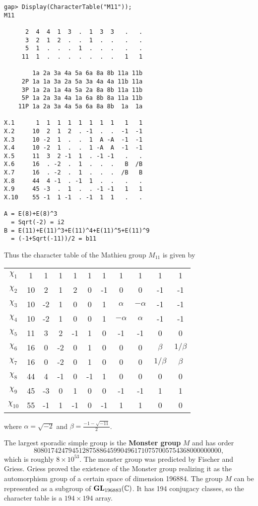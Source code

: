 \begin{lstlisting}
gap> Display(CharacterTable("M11"));
M11

      2  4  4  1  3  .  1  3  3   .   .
      3  2  1  2  .  .  1  .  .   .   .
      5  1  .  .  .  1  .  .  .   .   .
     11  1  .  .  .  .  .  .  .   1   1

        1a 2a 3a 4a 5a 6a 8a 8b 11a 11b
     2P 1a 1a 3a 2a 5a 3a 4a 4a 11b 11a
     3P 1a 2a 1a 4a 5a 2a 8a 8b 11a 11b
     5P 1a 2a 3a 4a 1a 6a 8b 8a 11a 11b
    11P 1a 2a 3a 4a 5a 6a 8a 8b  1a  1a

X.1      1  1  1  1  1  1  1  1   1   1
X.2     10  2  1  2  . -1  .  .  -1  -1
X.3     10 -2  1  .  .  1  A -A  -1  -1
X.4     10 -2  1  .  .  1 -A  A  -1  -1
X.5     11  3  2 -1  1  . -1 -1   .   .
X.6     16  . -2  .  1  .  .  .   B  /B
X.7     16  . -2  .  1  .  .  .  /B   B
X.8     44  4 -1  . -1  1  .  .   .   .
X.9     45 -3  .  1  .  . -1 -1   1   1
X.10    55 -1  1 -1  . -1  1  1   .   .

A = E(8)+E(8)^3
  = Sqrt(-2) = i2
B = E(11)+E(11)^3+E(11)^4+E(11)^5+E(11)^9
  = (-1+Sqrt(-11))/2 = b11
\end{lstlisting}

Thus the character table of the Mathieu group $M_{11}$ is
given by
\begin{center}
		\begin{tabular}{|c|cccccccccc|}
			\hline
			$\chi_{1}$ & 1 & 1 & 1 & 1 & 1 & 1 & 1 & 1 & 1 & 1\tabularnewline
			$\chi_{2}$ & 10 & 2 & 1 & 2 & 0 & -1 & 0 & 0 & -1 & -1 \tabularnewline
			$\chi_{3}$ & 10 & -2 & 1 & 0 & 0 & 1 & $\alpha$ & $-\alpha$ & -1 & -1\tabularnewline
		    $\chi_{4}$ & 10 & -2 & 1 & 0 & 0 & 1 & $-\alpha$ & $\alpha$ & -1 & -1\tabularnewline
		    $\chi_{5}$ & 11 & 3 & 2 &-1 & 1 & 0 & -1 & -1 & 0 & 0\tabularnewline
			$\chi_{6}$ & 16 & 0 & -2 & 0 & 1 & 0 & 0 & 0 & $\beta$ & $1/\beta$\tabularnewline
			$\chi_{7}$ & 16 & 0 & -2 & 0 & 1 & 0 & 0 & 0 & $1/\beta$ & $\beta$\tabularnewline
			$\chi_{8}$ & 44 & 4 &-1 & 0 &-1 & 1 & 0 & 0 & 0 & 0\tabularnewline
			$\chi_{9}$ & 45 & -3 & 0 & 1 & 0 & 0 &-1 &-1 &  1 & 1\tabularnewline
			$\chi_{10}$ & 55 & -1 & 1 & -1 & 0 & -1 & 1 & 1 & 0 & 0\tabularnewline
			\hline
		\end{tabular}    
\end{center}
where $\alpha=\sqrt{-2}$ and $\beta=\frac{-1-\sqrt{-11}}{2}$. 

The largest sporadic simple group is the \textbf{Monster group} $M$ and has order
\[
808017424794512875886459904961710757005754368000000000, 
\]
which is roughly $8\times 10^{53}$. 
The monster group was predicted by Fischer and Griess. 
Griess proved the existence of the Monster group realizing it as
the automorphism group of a certain space of dimension 196884. 
The group $M$ can be represented as
a subgroup of $\mathbf{GL}_{196883}(\mathbb{C})$. It has 194 conjugacy classes, so 
the character table is a $194\times 194$ array. 
